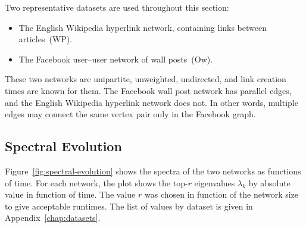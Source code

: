 \documentclass[11pt,a4paper]{book}
\newcommand{\syRank}{r}
\begin{document}
Two representative datasets are used throughout this section:
\begin{itemize}
  \item The English Wikipedia hyperlink network, containing links between
    articles~(\textsf{WP}).  
  \item The Facebook user--user network of wall posts~(\textsf{Ow}). 
\end{itemize}
These two networks are unipartite, unweighted, undirected, and link
creation times are known for them.  The Facebook wall post network
has parallel edges, and the English Wikipedia hyperlink network does
not. In other words, multiple edges may connect the same 
vertex pair only in the Facebook graph. 

\subsection{Spectral Evolution}
\label{sec:spectral-evolution}
Figure~\ref{fig:spectral-evolution} shows the spectra of the two
networks as functions of time.  For each network, the plot shows the
top-$\syRank$ eigenvalues $\lambda_k$ by absolute value in function
of time.  The value $\syRank$ was chosen in function of the network size to
give acceptable runtimes.  The list of values by dataset is given in
Appendix~\ref{chap:datasets}. 
\end{document}
